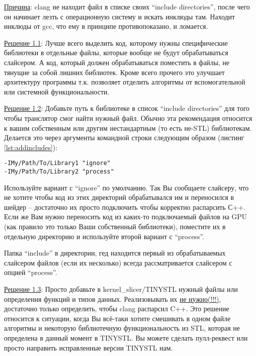 \documentclass[11pt,fleqn,english,russian]{report} %
\begin{document}
\noindent\underline{Причина}: clang не находит файл в списке своих ``include directories'', после чего он начинает лезть с операционную систему и искать инклюды там. Находит инклюды от gcc, что ему в принципе противопоказано, и ломается. 

\vspace*{5px}
\noindent\underline{Решение 1.1}: Лучше всего выделить код, которому нужны специфические библиотеки в отдельные файлы, которые вообще не будут обрабатываться слайсером. А код, который должен обрабатываться поместить в файлы, не тянущие за собой лишних библиотек. Кроме всего прочего это улучшает архитектуру программы т.к. позволяет отделить алгоритмы от вспомогательной или системной функциональности.

\vspace*{5px}
\noindent\underline{Решение 1.2}: Добавьте путь к библиотеке в список ``include directories'' для того чтобы транслятор смог найти нужный файл. Обычно эта рекомендация относится к вашим собственным или другим нестандартным (то есть не-STL) библиотекам. Делается это через аргументы командной строки следующим образом (листинг \ref{lst:addincludes}):

\begin{lstlisting}[caption=добавляем новый подключаемый файл, 
	label=lst:addincludes]	
-IMy/Path/To/Library1 "ignore"
-IMy/Path/To/Library2 "process"
\end{lstlisting}

Используйте вариант с ``ignore'' по умолчанию. Так Вы сообщаете слайсеру, что не хотите чтобы код из этих директорий обрабатывался им и переносился в шейдер -- достаточно их просто подключить чтобы корректно распарсить С++. Если же Вам нужно переносить код из каких-то подключаемый файлов на GPU (как правило это только Ваши собственный библиотеки), поместите их в отдельную директорию и используйте второй вариант с ``process''.

\begin{remark}
Папка ``include'' в директории, гед находится первый из обрабатываемых слайсером файлов (если их несколько) всегда рассматривается слайсером с опцией ``process''.
\end{remark}

\vspace*{5px}
\noindent\underline{Решение 1.3}: Просто добавьте в kernel\_slicer/TINYSTL нужный файлы или определения функций и типов данных. Реализовывать их \underline{не нужно(!!!)}, достаточно только определить, чтобы clang распарсил C++. Это решение относится к ситуации, когда Вы всё-таки хотите смешивать в одном файле алгоритмы и некоторую библиотечную функциональность из STL, которая не определена в данный момент в TINYSTL. Вы можете сделать пулл-реквест или просто направить исправленные версии TINYSTL нам.
\end{document}
